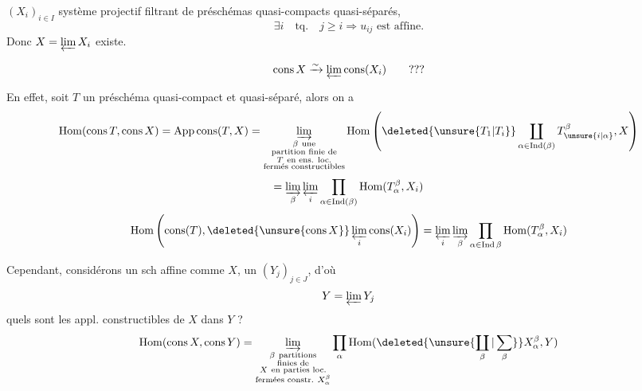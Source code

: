 $(X_i)_{i\in I}$ système projectif filtrant de préschémas quasi-compacts quasi-séparés,
\[
\exists i\quad\text{tq.}\quad j\geq i\Longrightarrow u_{ij}\text{ est affine}.
\]
Donc $X=\varprojlim X_i$ existe.

 
\[
\operatorname{cons}X\xrightarrow{\sim}\varprojlim\operatorname{cons}(X_i)\qquad ???
\]

En effet, soit $T$ un préschéma quasi-compact et quasi-séparé, alors on a
\[
\operatorname{Hom}(\operatorname{cons}T,\operatorname{cons}X)
=\operatorname{App\,cons}(T,X)
=\varinjlim_{\substack{\beta\ \text{une}\\\text{partition finie de}\\T\ \text{en ens. loc.}\\\text{fermés constructibles}}}
\operatorname{Hom}\left(\deleted{\unsure{T_1|T_i}}\coprod_{\alpha\in\operatorname{Ind}(\beta)}T_{\unsure{i|\alpha}}^\beta,X\right)
\]
\[
=\varinjlim_\beta\varprojlim_i\prod_{\alpha\in\operatorname{Ind}(\beta)}\operatorname{Hom}(T_\alpha^\beta,X_i)
\]
\[
\operatorname{Hom}\left(\operatorname{cons}(T),\deleted{\unsure{\operatorname{cons}X}}\varprojlim_i\operatorname{cons}(X_i)\right)
=\varprojlim_i\varinjlim_\beta\prod_{\alpha\in\operatorname{Ind}\beta}\operatorname{Hom}(T_\alpha^\beta,X_i)
\]

Cependant, considérons un sch affine comme $X$, un $(Y_j)_{j\in J}$, d'où
\[
Y=\varprojlim Y_j
\]
quels sont les  appl. constructibles de $X$ dans $Y$ ? 
\[
\operatorname{Hom}(\operatorname{cons}X,\operatorname{cons}Y)
=\varinjlim_{\substack{\beta\ \text{partitions}\\\text{finies de}\\X\ \text{en parties loc.}\\\text{fermées constr.}\ X_\alpha^\beta}}
\prod_\alpha\operatorname{Hom}(\deleted{\unsure{\coprod_\beta|\sum_\beta}}X_\alpha^\beta,Y)
\]
